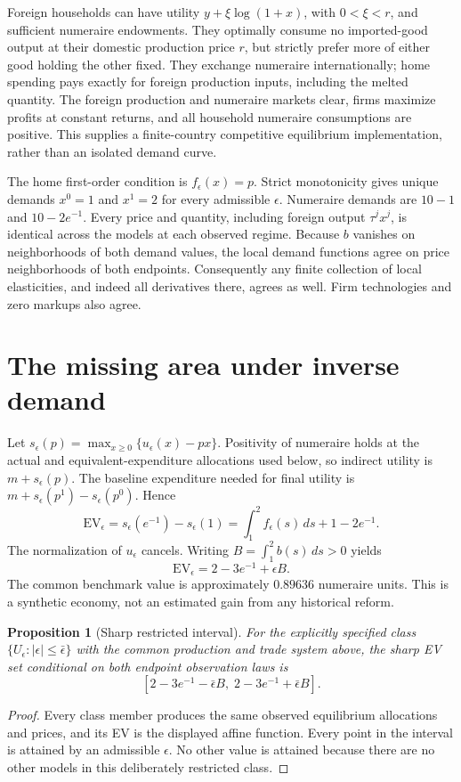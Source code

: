 \documentclass[11pt]{article}
\newtheorem{proposition}{Proposition}
\begin{document}
Foreign households can have utility $y+\xi\log(1+x)$, with $0<\xi<r$, and sufficient numeraire endowments. They optimally consume no imported-good output at their domestic production price $r$, but strictly prefer more of either good holding the other fixed. They exchange numeraire internationally; home spending pays exactly for foreign production inputs, including the melted quantity. The foreign production and numeraire markets clear, firms maximize profits at constant returns, and all household numeraire consumptions are positive. This supplies a finite-country competitive equilibrium implementation, rather than an isolated demand curve.

The home first-order condition is $f_\epsilon(x)=p$. Strict monotonicity gives unique demands $x^0=1$ and $x^1=2$ for every admissible $\epsilon$. Numeraire demands are $10-1$ and $10-2e^{-1}$. Every price and quantity, including foreign output $\tau^j x^j$, is identical across the models at each observed regime. Because $b$ vanishes on neighborhoods of both demand values, the local demand functions agree on price neighborhoods of both endpoints. Consequently any finite collection of local elasticities, and indeed all derivatives there, agrees as well. Firm technologies and zero markups also agree.

\section*{The missing area under inverse demand}
Let $s_\epsilon(p)=\max_{x\geq0}\{u_\epsilon(x)-px\}$. Positivity of numeraire holds at the actual and equivalent-expenditure allocations used below, so indirect utility is $m+s_\epsilon(p)$. The baseline expenditure needed for final utility is $m+s_\epsilon(p^1)-s_\epsilon(p^0)$. Hence
\[
 \mathrm{EV}_\epsilon=s_\epsilon(e^{-1})-s_\epsilon(1)
 =\int_1^2 f_\epsilon(s)\,ds+1-2e^{-1}.
\]
The normalization of $u_\epsilon$ cancels. Writing $B=\int_1^2b(s)\,ds>0$ yields
\[
 \boxed{\mathrm{EV}_\epsilon=2-3e^{-1}+\epsilon B.}
\]
The common benchmark value is approximately $0.89636$ numeraire units. This is a synthetic economy, not an estimated gain from any historical reform.

\begin{proposition}[Sharp restricted interval]
For the explicitly specified class $\{U_\epsilon:|\epsilon|\leq\bar\epsilon\}$ with the common production and trade system above, the sharp EV set conditional on both endpoint observation laws is
\[
 [2-3e^{-1}-\bar\epsilon B,\;2-3e^{-1}+\bar\epsilon B].
\]
\end{proposition}
\begin{proof}
Every class member produces the same observed equilibrium allocations and prices, and its EV is the displayed affine function. Every point in the interval is attained by an admissible $\epsilon$. No other value is attained because there are no other models in this deliberately restricted class.
\end{proof}
\end{document}
